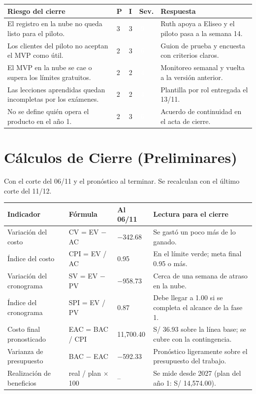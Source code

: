 \documentclass[11pt,a4paper]{article}
\newcommand{\etiqueta}[2]{{\setlength{\fboxsep}{2pt}\colorbox{#1}{\textcolor{white}{\scriptsize\bfseries #2}}}}
\begin{document}
{\small
{}
\noindent\begin{tabularx}{\textwidth}{@{}L C{0.6cm} C{0.6cm} C{0.9cm} P{4.2cm}@{}}
\toprule
{}
\textbf{Riesgo del cierre} & \textbf{P} & \textbf{I} & \textbf{Sev.} & \textbf{Respuesta} \\
\midrule
El registro en la nube no queda listo para el piloto. & 3 & 3 & \etiqueta{SevAlta}{\,9\,} & Ruth apoya a Eliseo y el piloto pasa a la semana 14. \\
Los clientes del piloto no aceptan el MVP como útil. & 2 & 3 & \etiqueta{SevAlta}{\,6\,} & Guion de prueba y encuesta con criterios claros. \\
El MVP en la nube se cae o supera los límites gratuitos. & 2 & 2 & \etiqueta{SevMedia}{\,4\,} & Monitoreo semanal y vuelta a la versión anterior. \\
Las lecciones aprendidas quedan incompletas por los exámenes. & 2 & 2 & \etiqueta{SevMedia}{\,4\,} & Plantilla por rol entregada el 13/11. \\
No se define quién opera el producto en el año 1. & 2 & 3 & \etiqueta{SevAlta}{\,6\,} & Acuerdo de continuidad en el acta de cierre. \\
\bottomrule
\end{tabularx}
}

\section{Cálculos de Cierre (Preliminares)}
Con el corte del 06/11 y el pronóstico al terminar. Se recalculan con el último corte del 11/12.

\vspace{0.1cm}
{\small
{}
\noindent\begin{tabularx}{\textwidth}{@{}P{3.4cm} P{3.0cm} Q{2.4cm} L@{}}
\toprule
{}
\textbf{Indicador} & \textbf{Fórmula} & \textbf{Al 06/11} & \textbf{Lectura para el cierre} \\
\midrule
Variación del costo & CV = EV $-$ AC & $-$342.68 & Se gastó un poco más de lo ganado. \\
Índice del costo & CPI = EV / AC & 0.95 & En el límite verde; meta final 0.95 o más. \\
Variación del cronograma & SV = EV $-$ PV & $-$958.73 & Cerca de una semana de atraso en la nube. \\
Índice del cronograma & SPI = EV / PV & 0.87 & Debe llegar a 1.00 si se completa el alcance de la fase 1. \\
Costo final pronosticado & EAC = BAC / CPI & 11,700.40 & S/ 36.93 sobre la línea base; se cubre con la contingencia. \\
Varianza de presupuesto & BAC $-$ EAC & $-$592.33 & Pronóstico ligeramente sobre el presupuesto del trabajo. \\
Realización de beneficios & real / plan $\times$ 100 & -- & Se mide desde 2027 (plan del año 1: S/ 14,574.00). \\
\bottomrule
\end{tabularx}
}
\end{document}
